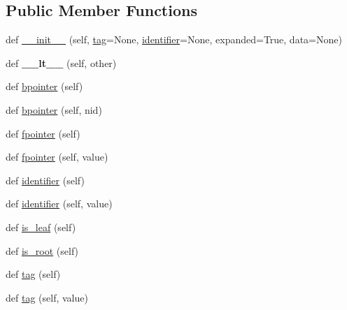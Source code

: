 \subsection*{Public Member Functions}
\begin{DoxyCompactItemize}
\item 
def \mbox{\hyperlink{classapp_1_1main_1_1treelib_1_1node_1_1Node_aac2165277078b78954b973a74fd68ba6}{\+\_\+\+\_\+init\+\_\+\+\_\+}} (self, \mbox{\hyperlink{classapp_1_1main_1_1treelib_1_1node_1_1Node_a5ddde76bda1e158e64eab1dc17712af6}{tag}}=None, \mbox{\hyperlink{classapp_1_1main_1_1treelib_1_1node_1_1Node_a8ef90e787789eb8af60606d46255564f}{identifier}}=None, expanded=True, data=None)
\item 
\mbox{\label{classapp_1_1main_1_1treelib_1_1node_1_1Node_a8e57640cfd3cceaf2a435810b907c096}} 
def {\bfseries \+\_\+\+\_\+lt\+\_\+\+\_\+} (self, other)
\item 
def \mbox{\hyperlink{classapp_1_1main_1_1treelib_1_1node_1_1Node_a55bc875d07efd5ef95890c57882d3578}{bpointer}} (self)
\item 
def \mbox{\hyperlink{classapp_1_1main_1_1treelib_1_1node_1_1Node_a74a05c3d863c43f25536f44b5e392932}{bpointer}} (self, nid)
\item 
def \mbox{\hyperlink{classapp_1_1main_1_1treelib_1_1node_1_1Node_a98442ca873604524b806978aca72addb}{fpointer}} (self)
\item 
def \mbox{\hyperlink{classapp_1_1main_1_1treelib_1_1node_1_1Node_afc312003b4159b00d8ed55fed0680474}{fpointer}} (self, value)
\item 
def \mbox{\hyperlink{classapp_1_1main_1_1treelib_1_1node_1_1Node_a8ef90e787789eb8af60606d46255564f}{identifier}} (self)
\item 
def \mbox{\hyperlink{classapp_1_1main_1_1treelib_1_1node_1_1Node_af0558bf5b5af7eb1b3b2ced14c50e869}{identifier}} (self, value)
\item 
def \mbox{\hyperlink{classapp_1_1main_1_1treelib_1_1node_1_1Node_ada4b689dcebea9b5b1adc7949b40e3d0}{is\+\_\+leaf}} (self)
\item 
def \mbox{\hyperlink{classapp_1_1main_1_1treelib_1_1node_1_1Node_a3e70bbc4a3f2e1642546769b4bc82949}{is\+\_\+root}} (self)
\item 
def \mbox{\hyperlink{classapp_1_1main_1_1treelib_1_1node_1_1Node_a5ddde76bda1e158e64eab1dc17712af6}{tag}} (self)
\item 
def \mbox{\hyperlink{classapp_1_1main_1_1treelib_1_1node_1_1Node_adce76642226ce58f591191ba3314797c}{tag}} (self, value)

\end{DoxyCompactItemize}
